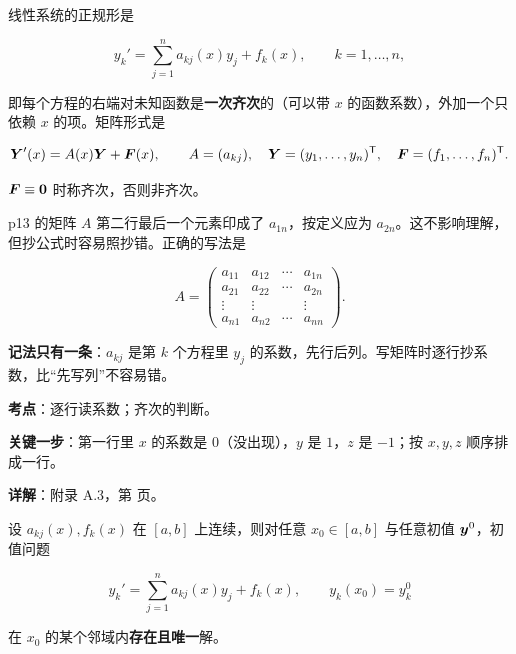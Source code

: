 \documentclass[11pt]{ctexart}
\renewcommand{\qbreak}{\needspace{0.26\textheight}}
\newcommand{\mat}[1]{\begin{pmatrix}#1\end{pmatrix}}
\begin{document}


线性系统的正规形是

\[
y_k'=\sum_{j=1}^{n}a_{kj}(x)y_j+f_k(x),\qquad k=1,\dots,n,
\]

即每个方程的右端对未知函数是\textbf{一次齐次}的（可以带 $x$ 的函数系数），外加一个只依赖 $x$ 的项。矩阵形式是

\[
\boldsymbol{Y}'(x)=A(x)\boldsymbol{Y}+\boldsymbol{F}(x),\qquad
A=(a_{kj}),\quad \boldsymbol{Y}=(y_1,\dots,y_n)^{\mathsf T},\quad \boldsymbol{F}=(f_1,\dots,f_n)^{\mathsf T}.
\]

$\boldsymbol{F}\equiv\boldsymbol{0}$ 时称齐次，否则非齐次。


p13 的矩阵 $A$ 第二行最后一个元素印成了 $a_{1n}$，按定义应为 $a_{2n}$。这不影响理解，但抄公式时容易照抄错。正确的写法是

\[
A=\mat{
a_{11} & a_{12} & \cdots & a_{1n}\\
a_{21} & a_{22} & \cdots & a_{2n}\\
\vdots & \vdots & & \vdots\\
a_{n1} & a_{n2} & \cdots & a_{nn}}.
\]

\textbf{记法只有一条}：$a_{kj}$ 是第 $k$ 个方程里 $y_j$ 的系数，先行后列。写矩阵时逐行抄系数，比“先写列”不容易错。


\qbreak
{}
\par\textbf{考点}：逐行读系数；齐次的判断。
\par\textbf{关键一步}：第一行里 $x$ 的系数是 $0$（没出现），$y$ 是 $1$，$z$ 是 $-1$；按 $x,y,z$ 顺序排成一行。
\par\textbf{详解}：附录 A.3，第 \pageref{app:a3} 页。



设 $a_{kj}(x),f_k(x)$ 在 $[a,b]$ 上连续，则对任意 $x_0\in[a,b]$ 与任意初值 $\boldsymbol{y}^0$，初值问题

\[
y_k'=\sum_{j=1}^{n}a_{kj}(x)y_j+f_k(x),\qquad y_k(x_0)=y_k^0
\]

在 $x_0$ 的某个邻域内\textbf{存在且唯一}解。
\end{document}
